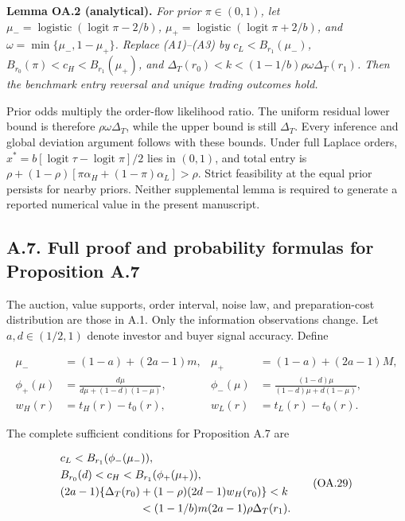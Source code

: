 \documentclass[
  11pt,
]{article}
\begin{document}

\protect{}\label{result-lemma-oa-2}{\textbf{Lemma OA.2
(analytical).}} \emph{For prior \(\pi\in(0,1)\), let
\(\mu_-=\operatorname{logistic}(\operatorname{logit}\pi-2/b)\),
\(\mu_+=\operatorname{logistic}(\operatorname{logit}\pi+2/b)\), and
\(\omega=\min\{\mu_-,1-\mu_+\}\). Replace (A1)--(A3) by
\(c_L<B_{r_1}(\mu_-)\), \(B_{r_0}(\pi)<c_H<B_{r_1}(\mu_+)\), and
\(\Delta_T(r_0)<k<(1-1/b)\rho\omega\Delta_T(r_1)\). Then the benchmark
entry reversal and unique trading outcomes hold.}

Prior odds multiply the order-flow likelihood ratio. The uniform
residual lower bound is therefore \(\rho\omega\Delta_T\), while the
upper bound is still \(\Delta_T\). Every inference and global deviation
argument follows with these bounds. Under full Laplace orders,
\(x^*=b[\operatorname{logit}\tau-\operatorname{logit}\pi]/2\) lies in
\((0,1)\), and total entry is
\(\rho+(1-\rho)[\pi\alpha_H+(1-\pi)\alpha_L]>\rho\). Strict feasibility
at the equal prior persists for nearby priors. Neither supplemental
lemma is required to generate a reported numerical value in the present
manuscript.

\subsection{A.7. Full proof and probability formulas for Proposition
A.7}\label{oa-a-signals}

The auction, value supports, order interval, noise law, and
preparation-cost distribution are those in A.1. Only the information
observations change. Let \(a,d\in(1/2,1)\) denote investor and buyer
signal accuracy. Define

\[
\begin{aligned}
\mu_-&=(1-a)+(2a-1)m,&\mu_+&=(1-a)+(2a-1)M,\\
\phi_+(\mu)&=\frac{d\mu}{d\mu+(1-d)(1-\mu)},&
\phi_-(\mu)&=\frac{(1-d)\mu}{(1-d)\mu+d(1-\mu)},\\
w_H(r)&=t_H(r)-t_0(r),&w_L(r)&=t_L(r)-t_0(r).
\end{aligned}
\tag{OA.28}\label{eq:oa-oa-28}
\]

The complete sufficient conditions for Proposition A.7 are

\[
\begin{aligned}
&c_L<B_{r_1}(\phi_-(\mu_-)),\\
&B_{r_0}(d)<c_H<B_{r_1}(\phi_+(\mu_+)),\\
&(2a-1)\{\Delta_T(r_0)+(1-\rho)(2d-1)w_H(r_0)\}<k\\
&\hspace{25mm}<(1-1/b)m(2a-1)\rho\Delta_T(r_1).
\end{aligned}
\tag{OA.29}\label{eq:oa-oa-29}
\]
\end{document}
